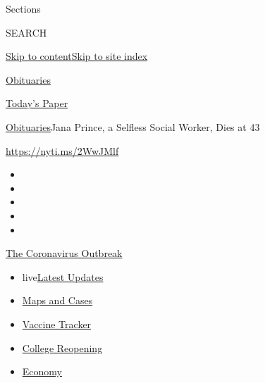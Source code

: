 Sections

SEARCH

\protect\hyperlink{site-content}{Skip to
content}\protect\hyperlink{site-index}{Skip to site index}

\href{https://www.nytimes.com/section/obituaries}{Obituaries}

\href{https://myaccount.nytimes.com/auth/login?response_type=cookie\&client_id=vi}{}

\href{https://www.nytimes.com/section/todayspaper}{Today's Paper}

\href{/section/obituaries}{Obituaries}\textbar{}Jana Prince, a Selfless
Social Worker, Dies at 43

\url{https://nyti.ms/2WwJMlf}

\begin{itemize}
\item
\item
\item
\item
\item
\end{itemize}

\href{https://www.nytimes.com/news-event/coronavirus?action=click\&pgtype=Article\&state=default\&region=TOP_BANNER\&context=storylines_menu}{The
Coronavirus Outbreak}

\begin{itemize}
\tightlist
\item
  live\href{https://www.nytimes.com/2020/08/03/world/coronavirus-covid-19.html?action=click\&pgtype=Article\&state=default\&region=TOP_BANNER\&context=storylines_menu}{Latest
  Updates}
\item
  \href{https://www.nytimes.com/interactive/2020/us/coronavirus-us-cases.html?action=click\&pgtype=Article\&state=default\&region=TOP_BANNER\&context=storylines_menu}{Maps
  and Cases}
\item
  \href{https://www.nytimes.com/interactive/2020/science/coronavirus-vaccine-tracker.html?action=click\&pgtype=Article\&state=default\&region=TOP_BANNER\&context=storylines_menu}{Vaccine
  Tracker}
\item
  \href{https://www.nytimes.com/2020/08/02/us/covid-college-reopening.html?action=click\&pgtype=Article\&state=default\&region=TOP_BANNER\&context=storylines_menu}{College
  Reopening}
\item
  \href{https://www.nytimes.com/live/2020/08/03/business/stock-market-today-coronavirus?action=click\&pgtype=Article\&state=default\&region=TOP_BANNER\&context=storylines_menu}{Economy}
\end{itemize}

